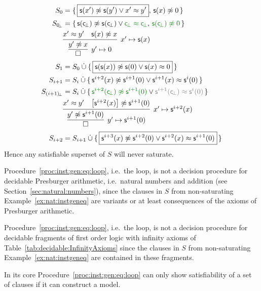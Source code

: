 \begin{example}
\begin{align*}
S_0 &= \{ \, \boxed{\msucc(x') \mNE \msucc (y') \lor x' \mEQ y'}, \, \msucc(x)\mNE 0 \, \}
\\
S_{0\!_\bot} &= \{ \, \msucc(\consbot) \mNE \msucc (\consbot) \lor{\colHi\consbot \mEQ \consbot}, \, {\colHi \msucc(\consbot)\mNE 0} \, \}
\\
&\infer[x'\mapsto \msucc(x)
]{
	\infer[y'\mapsto 0]{\emptyclause}{ y'\mNE x }
}
{x' \mEQ y' & \msucc(x)\mNE x}
\\
S_1 &= S_0\disjointunion \{ \,
\boxed{\msucc(\msucc(x)) \mNE \msucc(0) \lor \msucc(x) \mEQ 0} \,
\}
\\
S_{i+1} &= S_i\disjointunion \{ \,
\msucc^{i+2}(x) \mNE \msucc^{i+1} (0) \lor \msucc^{i+1}(x) \mEQ \msucc^i(0) \,
\}
\\
S_{(i+1)\!_\bot} &= S_i\disjointunion \{ \,
{\colHi \msucc^{i+2}(\consbot) \mNE \msucc^{i+1} (0)} \lor {\colG\msucc^{i+1}(\consbot) \mEQ \msucc^i(0)} \,
\}
\\
&\infer[x'\mapsto \msucc^{i+2}(x)
]{
	\infer[y'\mapsto \msucc^{i+1}(0)]{\emptyclause}{ y'\mNE \msucc^{i+1}(0) }
}
{x' \mEQ y' & \left[\msucc^{i+2}(x)\right]\mNE \msucc^{i+1}(0)}
\\
S_{i+2} &= S_{i+1}\disjointunion \{ \,
\boxed{\msucc^{i+3}(x) \mNE \msucc^{i+2}(0) \lor \msucc^{i+2}(x) \mEQ \msucc^{i+1}(0)} \,
\}
\end{align*}
Hence any satisfiable superset of \( S \) will never saturate.
\end{example}

\begin{corollary}
	Procedure~\ref{proc:inst:gen:eq:loop}, i.e.~the \InstGenEQ loop, 
	is not a decision procedure for decidable Presburger arithmetic,
	i.e.~natural numbers and addition (see Section~\vref{sec:natural:numbers}),
	since the clauses in \( S \) from non-saturating Example~\vref{ex:nat:instgeneq} 
	are variants or at least consequences of the axioms of Presburger arithmetic.
\end{corollary}

\begin{corollary}
	Procedure~\ref{proc:inst:gen:eq:loop}, i.e.~the \InstGenEQ loop, is not a decision procedure for decidable fragments of first order logic with infinity axioms of Table~\vref{tab:decidable:InfinityAxioms}
	since the clauses in \( S \) from non-saturating Example~\vref{ex:nat:instgeneq}
	are contained in these fragments.
\end{corollary}

In its core Procedure~\ref{proc:inst:gen:eq:loop} can only show satisfiability of a set of clauses if it can construct a model.



